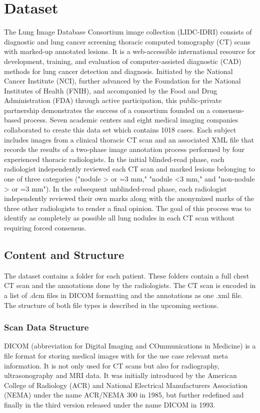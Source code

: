 \documentclass[../Thesis.tex]{subfiles}
\begin{document}
\chapter{Dataset}
The Lung Image Database Consortium image collection (LIDC-IDRI) consists of diagnostic and lung cancer screening thoracic computed tomography (CT) scans with marked-up annotated lesions. It is a web-accessible international resource for development, training, and evaluation of computer-assisted diagnostic (CAD) methods for lung cancer detection and diagnosis. Initiated by the National Cancer Institute (NCI), further advanced by the Foundation for the National Institutes of Health (FNIH), and accompanied by the Food and Drug Administration (FDA) through active participation, this public-private partnership demonstrates the success of a consortium founded on a consensus-based process.
Seven academic centers and eight medical imaging companies collaborated to create this data set which contains 1018 cases.  Each subject includes images from a clinical thoracic CT scan and an associated XML file that records the results of a two-phase image annotation process performed by four experienced thoracic radiologists. In the initial blinded-read phase, each radiologist independently reviewed each CT scan and marked lesions belonging to one of three categories ("nodule > or =3 mm," "nodule <3 mm," and "non-nodule > or =3 mm"). In the subsequent unblinded-read phase, each radiologist independently reviewed their own marks along with the anonymized marks of the three other radiologists to render a final opinion. The goal of this process was to identify as completely as possible all lung nodules in each CT scan without requiring forced consensus. \cite{armato2011lung}

\section{Content and Structure}
The dataset contains a folder for each patient. These folders contain a full chest CT scan and the annotations done by the radiologists. The CT scan is encoded in a list of .dcm files in DICOM formatting and the annotations as one .xml file. The structure of both file types is described in the upcoming sections.

\subsection{Scan Data Structure}
DICOM (abbreviation for Digital Imaging and COmmunications in Medicine) is a file format for storing medical images with for the use case relevant meta information. It is not only used for CT scans but also for radiography, ultrasonography and MRI data. It was initially introduced by the American College of Radiology (ACR) and National Electrical Manufacturers Association (NEMA) under the name ACR/NEMA 300 in 1985, but further redefined and finally in the third version released under the name DICOM in 1993\cite{pianykh2008}.
\end{document}
